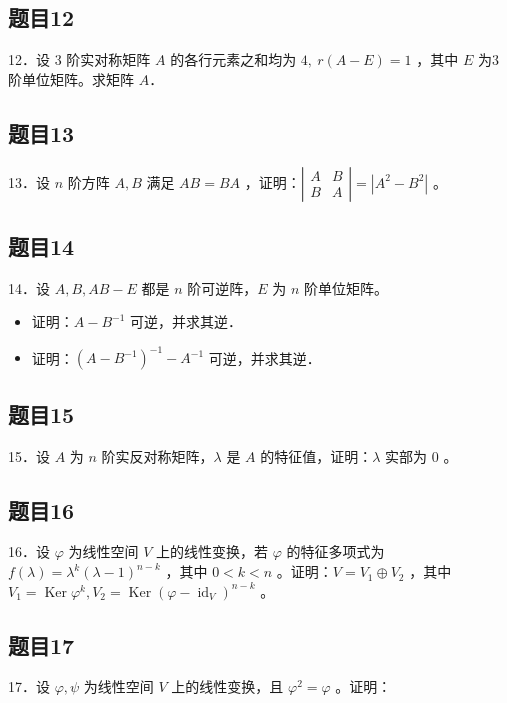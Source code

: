 \documentclass{article}
\begin{document}
\subsection{题目12}
12．设 3 阶实对称矩阵 \(A\) 的各行元素之和均为 \(4, ~ r(A-E)=1\) ，其中 \(E\) 为3阶单位矩阵。求矩阵 \(A\)．\\

\subsection{题目13}
13．设 \(n\) 阶方阵 \(A, B\) 满足 \(A B=B A\) ，证明：\(\left|\begin{array}{ll}A & B \\ B & A\end{array}\right|=\left|A^{2}-B^{2}\right|\) 。\\

\subsection{题目14}
14．设 \(A, B, A B-E\) 都是 \(n\) 阶可逆阵，\(E\) 为 \(n\) 阶单位矩阵。

\begin{itemize}
  \item[（1）] 证明：\(A-B^{-1}\) 可逆，并求其逆．
  \item[（2）] 证明：\(\left(A-B^{-1}\right)^{-1}-A^{-1}\) 可逆，并求其逆．
\end{itemize}

\subsection{题目15}
15．设 \(A\) 为 \(n\) 阶实反对称矩阵，\(\lambda\) 是 \(A\) 的特征值，证明：\(\lambda\) 实部为 0 。\\

\subsection{题目16}
16．设 \(\varphi\) 为线性空间 \(V\) 上的线性变换，若 \(\varphi\) 的特征多项式为 \(f(\lambda)=\lambda^{k}(\lambda-1)^{n-k}\) ，其中 \(0<k<n\) 。证明：\(V=V_{1} \oplus V_{2}\) ，其中 \(V_{1}=\operatorname{Ker} \varphi^{k}, V_{2}=\operatorname{Ker}\left(\varphi-\operatorname{id}_{V}\right)^{n-k}\) 。\\

\subsection{题目17}
17．设 \(\varphi, \psi\) 为线性空间 \(V\) 上的线性变换，且 \(\varphi^{2}=\varphi\) 。证明：
\end{document}
